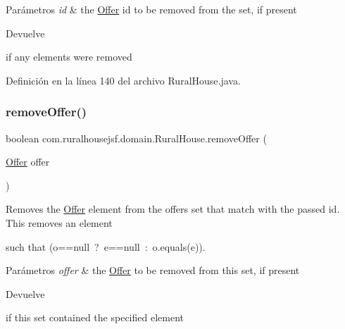 \begin{DoxyParams}{Parámetros}
{\em id} & the \mbox{\hyperlink{classcom_1_1ruralhousejsf_1_1domain_1_1_offer}{Offer}} id to be removed from the set, if present \\
\hline
\end{DoxyParams}
\begin{DoxyReturn}{Devuelve}

\begin{DoxyCode}{0}
\DoxyCodeLine{\textcolor{keyword}{true} }
\end{DoxyCode}
 if any elements were removed 
\end{DoxyReturn}


Definición en la línea 140 del archivo Rural\+House.\+java.

\mbox{\label{classcom_1_1ruralhousejsf_1_1domain_1_1_rural_house_a36466194bda46f454c816aa5845c0d14}} 
\subsubsection{\texorpdfstring{removeOffer()}{removeOffer()}\hspace{0.1cm}{\footnotesize\ttfamily [2/2]}}
{\footnotesize\ttfamily boolean com.\+ruralhousejsf.\+domain.\+Rural\+House.\+remove\+Offer (\begin{DoxyParamCaption}\item[{\mbox{\hyperlink{classcom_1_1ruralhousejsf_1_1domain_1_1_offer}{Offer}}}]{offer }\end{DoxyParamCaption})}

Removes the \mbox{\hyperlink{classcom_1_1ruralhousejsf_1_1domain_1_1_offer}{Offer}} element from the offers set that match with the passed id. This removes an element
\begin{DoxyCode}{0}
\end{DoxyCode}
 such that {\ttfamily (o==null~?~e==null~\+:~o.\+equals(e))}.


\begin{DoxyParams}{Parámetros}
{\em offer} & the \mbox{\hyperlink{classcom_1_1ruralhousejsf_1_1domain_1_1_offer}{Offer}} to be removed from this set, if present \\
\hline
\end{DoxyParams}
\begin{DoxyReturn}{Devuelve}

\begin{DoxyCode}{0}
\DoxyCodeLine{\textcolor{keyword}{true} }
\end{DoxyCode}
 if this set contained the specified element 
\end{DoxyReturn}


